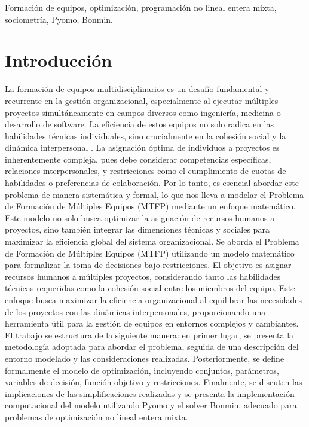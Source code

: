 \documentclass[conference]{IEEEtran}
\begin{document}
\begin{IEEEkeywords}
    Formación de equipos, optimización, programación no lineal entera mixta, sociometría, Pyomo, Bonmin.
\end{IEEEkeywords}

\section{Introducción}
La formación de equipos multidisciplinarios es un desafío fundamental y recurrente en la gestión organizacional, especialmente al ejecutar múltiples proyectos simultáneamente en campos diversos como ingeniería, medicina o desarrollo de software. La eficiencia de estos equipos no solo radica en las habilidades técnicas individuales, sino crucialmente en la cohesión social y la dinámica interpersonal \cite{gutierrez2016multiple}. La asignación óptima de individuos a proyectos es inherentemente compleja, pues debe considerar competencias específicas, relaciones interpersonales, y restricciones como el cumplimiento de cuotas de habilidades o preferencias de colaboración.
Por lo tanto, es esencial abordar este problema de manera sistemática y formal, lo que nos lleva a modelar el Problema de Formación de Múltiples Equipos (MTFP) mediante un enfoque matemático. Este modelo no solo busca optimizar la asignación de recursos humanos a proyectos, sino también integrar las dimensiones técnicas y sociales para maximizar la eficiencia global del sistema organizacional.
Se aborda el Problema de Formación de Múltiples Equipos (MTFP) utilizando un modelo matemático para formalizar la toma de decisiones bajo restricciones.
El objetivo es asignar recursos humanos a múltiples proyectos, considerando tanto las habilidades técnicas requeridas como la cohesión social entre los miembros del equipo. Este enfoque busca maximizar la eficiencia organizacional al equilibrar las necesidades de los proyectos con las dinámicas interpersonales, proporcionando una herramienta útil para la gestión de equipos en entornos complejos y cambiantes.
El trabajo se estructura de la siguiente manera: en primer lugar, se presenta la metodología adoptada para abordar el problema, seguida de una descripción del entorno modelado y las consideraciones realizadas. Posteriormente, se define formalmente el modelo de optimización, incluyendo conjuntos, parámetros, variables de decisión, función objetivo y restricciones. Finalmente, se discuten las implicaciones de las simplificaciones realizadas y se presenta la implementación computacional del modelo utilizando Pyomo y el solver Bonmin, adecuado para problemas de optimización no lineal entera mixta.
\end{document}
